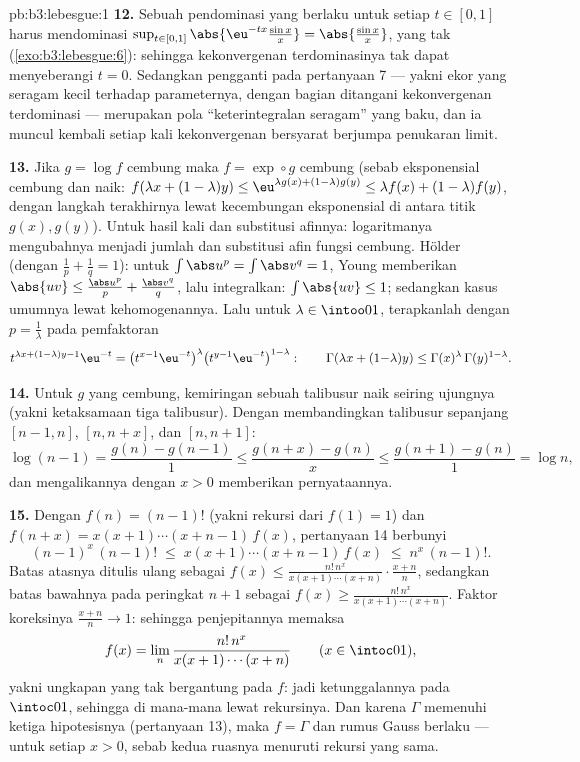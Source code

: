 \begin{solution}{pb:b3:lebesgue:1}
\textbf{12.} Sebuah pendominasi yang berlaku untuk setiap $t \in [0,1]$ harus
mendominasi $\sup_{t\in[0,1]}\abs{\eu^{-tx}\frac{\sin
x}x} = \abs{\frac{\sin x}x}$, yang tak 
(\cref{exo:b3:lebesgue:6}): sehingga kekonvergenan terdominasinya tak dapat menyeberangi $t = 0$. Sedangkan
pengganti pada pertanyaan 7 --- yakni ekor yang seragam kecil terhadap
parameternya, dengan bagian  ditangani kekonvergenan terdominasi --- merupakan pola
``keterintegralan seragam'' yang baku, dan ia muncul kembali setiap kali
kekonvergenan bersyarat berjumpa penukaran limit.

\textbf{13.} Jika $g = \log f$ cembung maka $f = \exp\circ g$
cembung (sebab eksponensial cembung dan naik: $f(\lambda x + (1-\lambda)
y) \leq \eu^{\lambda g(x) + (1-\lambda)g(y)} \leq \lambda f(x)
+ (1-\lambda)f(y)$, dengan langkah terakhirnya lewat kecembungan eksponensial di antara
titik $g(x), g(y)$). Untuk hasil kali dan substitusi afinnya:
logaritmanya mengubahnya menjadi jumlah dan substitusi afin
fungsi cembung. Hölder (dengan $\frac1p + \frac1q = 1$): untuk
$\int\abs u^p = \int\abs v^q = 1$, Young memberikan $\abs{uv} \leq
\frac{\abs u^p}p + \frac{\abs v^q}q$, lalu integralkan: $\int\abs{uv}
\leq 1$; sedangkan kasus umumnya lewat kehomogenannya. Lalu untuk $\lambda
\in \intoo01$, terapkanlah dengan $p = \frac1\lambda$ pada
pemfaktoran
\[
t^{\lambda x + (1-\lambda)y - 1}\eu^{-t}
= \bigl(t^{x-1}\eu^{-t}\bigr)^{\lambda}
\bigl(t^{y-1}\eu^{-t}\bigr)^{1-\lambda} :
\qquad
\Gamma(\lambda x + (1{-}\lambda)y) \leq
\Gamma(x)^\lambda\,\Gamma(y)^{1-\lambda} .
\]

\textbf{14.} Untuk $g$ yang cembung, kemiringan sebuah talibusur naik
seiring ujungnya (yakni ketaksamaan tiga talibusur). Dengan membandingkan
talibusur sepanjang $[n-1, n]$, $[n, n+x]$, dan $[n, n+1]$:
\[
\log(n-1) = \frac{g(n) - g(n-1)}1 \leq
\frac{g(n+x) - g(n)}x \leq \frac{g(n+1) - g(n)}1 = \log n,
\]
dan mengalikannya dengan $x > 0$ memberikan pernyataannya.

\textbf{15.} Dengan $f(n) = (n-1)!$ (yakni rekursi dari $f(1) = 1$)
dan $f(n + x) = x(x+1)\cdots(x+n-1)\,f(x)$, pertanyaan 14 berbunyi
\[
(n-1)^x\,(n-1)! \;\leq\; x(x+1)\cdots(x+n-1)\,f(x)
\;\leq\; n^x\,(n-1)! .
\]
Batas atasnya ditulis ulang sebagai $f(x) \leq
\frac{n!\,n^x}{x(x+1)\cdots(x+n)}\cdot\frac{x+n}n$, sedangkan
batas bawahnya pada peringkat $n+1$ sebagai $f(x) \geq
\frac{n!\,n^x}{x(x+1)\cdots(x+n)}$. Faktor koreksinya
$\frac{x+n}n \to 1$: sehingga penjepitannya memaksa
\[
f(x) = \lim_n\frac{n!\,n^x}{x(x+1)\cdots(x+n)}
\qquad (x \in \intoc01),
\]
yakni ungkapan yang tak bergantung pada $f$: jadi ketunggalannya pada $\intoc01$,
sehingga di mana-mana lewat rekursinya. Dan karena $\Gamma$ memenuhi
ketiga hipotesisnya (pertanyaan 13), maka $f = \Gamma$ dan rumus
Gauss berlaku --- untuk setiap $x > 0$, sebab kedua ruasnya menuruti
rekursi yang sama.


\end{solution}
